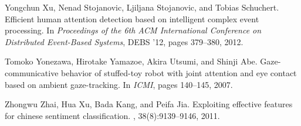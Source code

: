 \documentclass[12pt]{article}
\begin{document}
\begin{thebibliography}{10}
Yongchun Xu, Nenad Stojanovic, Ljiljana Stojanovic, and Tobias Schuchert.
\newblock Efficient human attention detection based on intelligent complex
  event processing.
\newblock In {\em Proceedings of the 6th ACM International Conference on
  Distributed Event-Based Systems}, DEBS '12, pages 379--380, 2012.

Tomoko Yonezawa, Hirotake Yamazoe, Akira Utsumi, and Shinji Abe.
\newblock Gaze-communicative behavior of stuffed-toy robot with joint attention
  and eye contact based on ambient gaze-tracking.
\newblock In {\em ICMI}, pages 140--145, 2007.

Zhongwu Zhai, Hua Xu, Bada Kang, and Peifa Jia.
\newblock Exploiting effective features for chinese sentiment classification.
, 38(8):9139--9146, 2011.

\end{thebibliography}


% 


\label{maxSeitenzahl}
\end{document}
